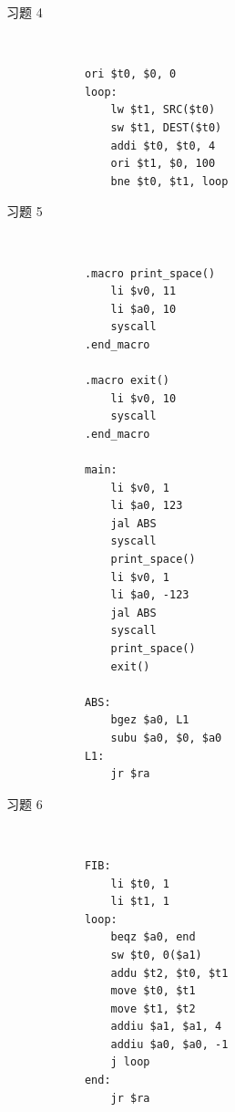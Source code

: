 \begin{problem}
    习题 4
    \begin{solution}
        \ 
        \begin{verbatim}
            ori $t0, $0, 0
            loop:
                lw $t1, SRC($t0)
                sw $t1, DEST($t0)
                addi $t0, $t0, 4
                ori $t1, $0, 100
                bne $t0, $t1, loop
        \end{verbatim}
    \end{solution}
\end{problem}

\begin{problem}
    习题 5
    \begin{solution}
        \ 
        \begin{verbatim}
            .macro print_space()
                li $v0, 11
                li $a0, 10
                syscall
            .end_macro

            .macro exit()
                li $v0, 10
                syscall
            .end_macro

            main:
                li $v0, 1
                li $a0, 123
                jal ABS
                syscall
                print_space()
                li $v0, 1
                li $a0, -123
                jal ABS
                syscall
                print_space()
                exit()

            ABS:
                bgez $a0, L1
                subu $a0, $0, $a0
            L1:
                jr $ra
        \end{verbatim}
    \end{solution}
\end{problem}

\begin{problem}
    习题 6
    \begin{solution}
        \ 
        \begin{verbatim}
            FIB:
                li $t0, 1
                li $t1, 1
            loop:
                beqz $a0, end
                sw $t0, 0($a1)
                addu $t2, $t0, $t1
                move $t0, $t1
                move $t1, $t2
                addiu $a1, $a1, 4
                addiu $a0, $a0, -1
                j loop
            end:
                jr $ra
        \end{verbatim}
    \end{solution}
\end{problem}

